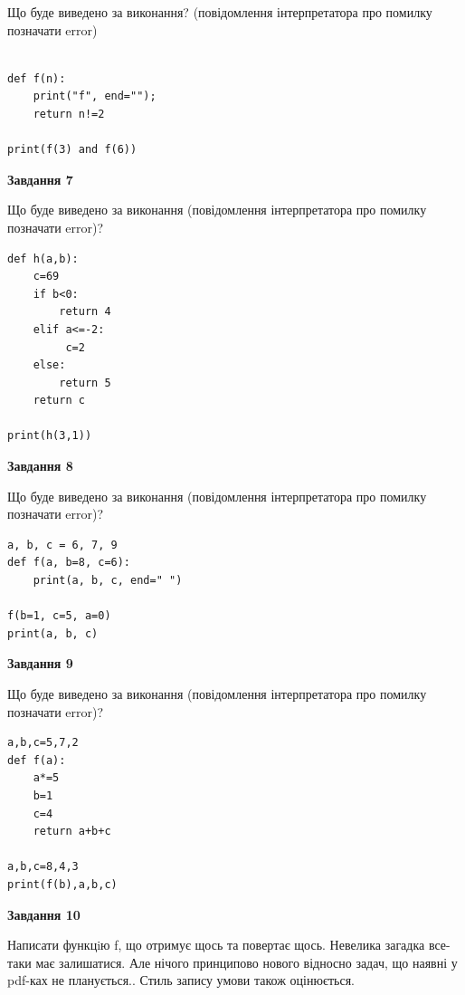 \documentclass[12pt, ukrainian]{article}
\begin{document}
{\begin {large}
Що буде виведено за виконання? (повідомлення інтерпретатора про помилку позначати error)\par
\begin{verbatim}

def f(n):
    print("f", end="");
    return n!=2

print(f(3) and f(6))
\end{verbatim}

{\begin {center}\textbf{Завдання 7}\end {center}}

Що буде виведено за виконання (повідомлення інтерпретатора про помилку позначати error)?\par
\begin{verbatim}
def h(a,b):
    c=69
    if b<0:
        return 4
    elif a<=-2:
         c=2
    else: 
        return 5
    return c

print(h(3,1))
\end{verbatim}

{\begin {center}\textbf{Завдання 8}\end {center}}

Що буде виведено за виконання (повідомлення інтерпретатора про помилку позначати error)?\par
\begin{verbatim}
a, b, c = 6, 7, 9
def f(a, b=8, c=6):
    print(a, b, c, end=" ")

f(b=1, c=5, a=0)
print(a, b, c)
\end{verbatim}

{\begin {center}\textbf{Завдання 9}\end {center}}

Що буде виведено за виконання (повідомлення інтерпретатора про помилку позначати error)?\par
\begin{verbatim}
a,b,c=5,7,2
def f(a):
    a*=5
    b=1
    c=4
    return a+b+c

a,b,c=8,4,3
print(f(b),a,b,c)
\end{verbatim}

{\begin {center}\textbf{Завдання 10}\end {center}}


Написати функцiю f, що отримує щось та повертає щось. Невелика загадка все-таки має залишатися. Але нічого принципово нового відносно задач, що наявні у pdf-ках не планується.. Стиль запису умови також оцінюється.\par
\end {large}}
\newpage
\end{document}
